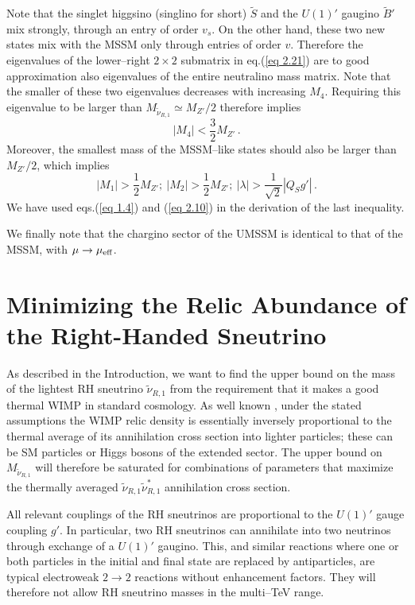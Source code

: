\documentclass[a4paper,11pt]{article}
\begin{document}
Note that the singlet higgsino (singlino for short) $\tilde S$ and the
$U(1)'$ gaugino $\tilde B'$ mix strongly, through an entry of order
$v_s$. On the other hand, these two new states mix with the MSSM only
through entries of order $v$. Therefore the eigenvalues of the
lower--right $2 \times 2$ submatrix in eq.(\ref{eq 2.21}) are to good
approximation also eigenvalues of the entire neutralino mass
matrix. Note that the smaller of these two eigenvalues decreases with
increasing $M_4$. Requiring this eigenvalue to be larger than
$M_{\tilde \nu_{R,1}} \simeq M_{Z'}/2$ therefore implies
%
\begin{equation} \label{neut1}
| M_4 | < \frac{3}{2} M_{Z'}\,.
\end{equation}
%
Moreover, the smallest mass of the MSSM--like states should also be larger
than $M_{Z'}/2$, which implies
%
\begin{equation} \label{neut2}
|M_1| > \frac{1}{2} M_{Z'}; \ |M_2| > \frac{1}{2} M_{Z'}; \
|\lambda| > \frac{1}{\sqrt{2}} |Q_S g'| \,.
\end{equation}
%
We have used eqs.(\ref{eq 1.4}) and (\ref{eq 2.10}) in the derivation of
the last inequality.

We finally note that the chargino sector of the UMSSM is identical to
that of the MSSM, with $\mu \rightarrow \mu_{\rm eff}$.
 

\section{Minimizing the Relic Abundance of the 
Right-Handed Sneutrino}
\label{section3}

As described in the Introduction, we want to find the upper bound on
the mass of the lightest RH sneutrino $\tilde \nu_{R,1}$ from the
requirement that it makes a good thermal WIMP in standard cosmology.
As well known \cite{kt}, under the stated assumptions the WIMP relic
density is essentially inversely proportional to the thermal average
of its annihilation cross section into lighter particles; these can be
SM particles or Higgs bosons of the extended sector. The upper bound
on $M_{\tilde \nu_{R,1}}$ will therefore be saturated for combinations
of parameters that maximize the thermally averaged
$\tilde \nu_{R,1} \tilde \nu_{R,1}^*$ annihilation cross section. 

All relevant couplings of the RH sneutrinos are proportional to
the $U(1)'$ gauge coupling $g'$. In particular, two RH sneutrinos can
annihilate into two neutrinos through exchange of a $U(1)'$ gaugino.
This, and similar reactions where one or both particles in the initial
and final state are replaced by antiparticles, are typical electroweak
$2 \rightarrow 2$ reactions without enhancement factors. They will
therefore not allow RH sneutrino masses in the multi--TeV range.
\end{document}
